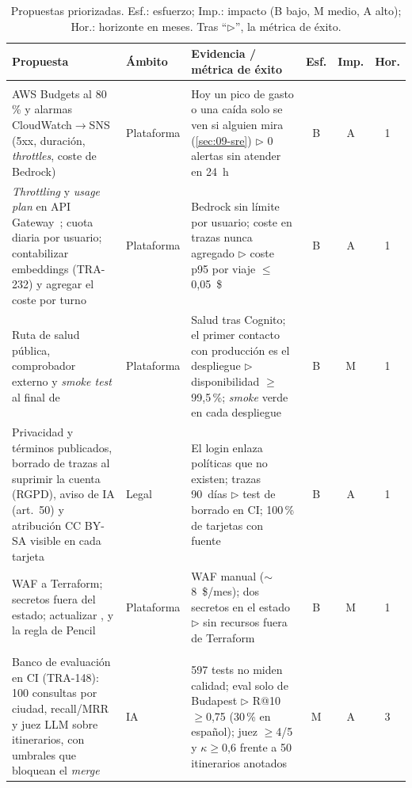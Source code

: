 \begin{table}[tb]\centering\scriptsize
\caption{Propuestas priorizadas. Esf.: esfuerzo; Imp.: impacto (B bajo, M medio, A alto); Hor.:
horizonte en meses. Tras ``$\triangleright$'', la métrica de éxito.}
\label{tab:10-propuestas}
\begin{tabularx}{\textwidth}{@{}>{\raggedright\arraybackslash}p{7.2cm}lYccc@{}}
\toprule
Propuesta & Ámbito & Evidencia / métrica de éxito & Esf. & Imp. & Hor. \\
\midrule
{} \\
AWS Budgets al 80\,\% y alarmas CloudWatch$\to$SNS (5xx, duración, \emph{throttles}, coste de Bedrock)~\cite{cr:budgets} & Plataforma & Hoy un pico de gasto o una caída solo se ven si alguien mira (\cref{sec:09-sre}) $\triangleright$ 0 alertas sin atender en 24~h & B & A & 1 \\
\emph{Throttling} y \emph{usage plan} en API Gateway~\cite{cr:apigwthrottling}; cuota diaria por usuario; contabilizar embeddings (TRA-232) y agregar el coste por turno & Plataforma & Bedrock sin límite por usuario; coste en trazas nunca agregado $\triangleright$ coste p95 por viaje $\leq$0,05~\$ & B & A & 1 \\
Ruta de salud pública, comprobador externo y \emph{smoke test} al final de  & Plataforma & Salud tras Cognito; el primer contacto con producción es el despliegue $\triangleright$ disponibilidad $\geq$99,5\,\%; \emph{smoke} verde en cada despliegue & B & M & 1 \\
Privacidad y términos publicados, borrado de trazas al suprimir la cuenta (RGPD), aviso de IA (art.~50) y atribución CC BY-SA visible en cada tarjeta & Legal & El login enlaza políticas que no existen; trazas 90~días $\triangleright$ test de borrado en CI; 100\,\% de tarjetas con fuente & B & A & 1 \\
WAF a Terraform; secretos fuera del estado; actualizar ,  y la regla de Pencil & Plataforma & WAF manual ($\sim$8~\$/mes); dos secretos en el estado $\triangleright$  sin recursos fuera de Terraform & B & M & 1 \\
\midrule
{} \\
Banco de evaluación en CI (TRA-148): 100 consultas por ciudad, recall/MRR y juez LLM sobre itinerarios, con umbrales que bloquean el \emph{merge} & IA & 597 tests no miden calidad; eval solo de Budapest $\triangleright$ R@10 $\geq$0,75 (30\,\% en español); juez $\geq$4/5 y $\kappa\geq$0,6 frente a 50 itinerarios anotados & M & A & 3 \\

\end{tabularx}
\end{table}

